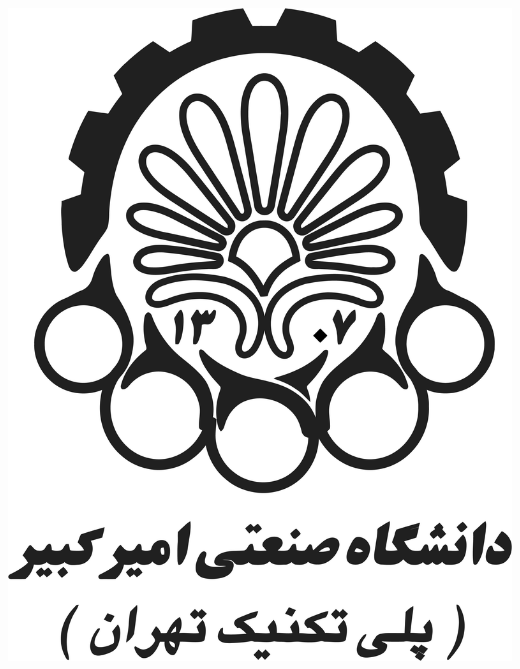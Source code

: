 
\begin{center}

\includegraphics[scale=0.18]{images/aut-fa2.png}

\large\ThesisDepartment

\begin{large}
\vspace{0.5cm}



\end{large}

\vspace{1cm}


{\large\textbf{\ThesisClass}}
\vspace{1cm}

{\large\textbf{\ThesisAuthor}}



\end{center}
